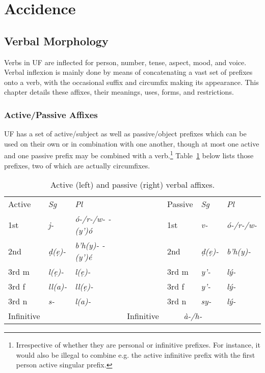 \documentclass[a4paper, 12pt, oneside, final]{article}
\let \nf \normalfont
\def \d {ḍ}
\begin{document}

\clearpage

\section{Accidence}\label{sec:accidence}
\subsection{Verbal Morphology}\label{subsec:verbal-morphology}
Verbs in UF are inflected for person, number, tense, aspect, mood, and voice. Verbal inflexion is mainly done
by means of concatenating a vast set of prefixes onto a verb, with the occasional suffix and circumfix making
its appearance. This chapter details these affixes, their meanings, uses, forms, and restrictions.


\subsubsection{Active/Passive Affixes}\label{subsubsec:active-passive-affixes}
UF has a set of active/subject as well as passive/object prefixes which can be used on their own or in combination
with one another, though at most one active and one passive prefix may be combined with a verb.\footnote{Irrespective
of whether they are personal or infinitive prefixes. For instance, it would also be illegal to combine e.g. the active
infinitive prefix with the first person active singular prefix.} Table~\ref{tab:active-passive-prefixes}
below lists those prefixes, two of which are actually circumfixes.

\begin{table}[h]
\centering
\noindent\begin{tabular}{@{}|>{}l|>{\it}l|>{\it}l|>{}l|>{}l|>{\it}l|>{\it}l|}\cline{1-3}\cline{5-7}
 Active&\nf Sg&\nf Pl& & Passive&\nf Sg&\nf Pl\\\cline{1-3}\cline{5-7}
1st&j-&ó-/r-/w- -(y’)ó&&1st&v-&ó-/r-/w-\\\cline{1-3}\cline{5-7}
2nd&\d{}(ẹ)-&b’h(y)- -(y’)é&&2nd&\d{}(ẹ)-&b’h(y)-\\\cline{1-3}\cline{5-7}
3rd m&l(ẹ)-&l(ẹ)-&&3rd m&y’-&lý-\\\cline{1-3}\cline{5-7}
3rd f&ll(a)-&ll(ẹ)-&&3rd f&y’- &lý-\\\cline{1-3}\cline{5-7}
3rd n&s- &l(a)-&&3rd n&sy-&lý-\\\cline{1-3}\cline{5-7}
Infinitive&\multicolumn{2}{c|}{\it d(ẹ)-}&&Infinitive&\multicolumn{2}{c|}{\it à-/h-}\\\cline{1-3}\cline{5-7}
\end{tabular}
\caption{Active (left) and passive (right) verbal affixes.}\label{tab:active-passive-prefixes}
\end{table}
\end{document}
